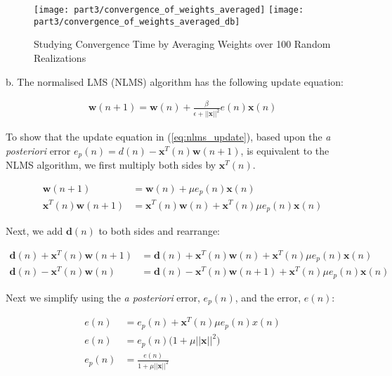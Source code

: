 \begin{figure}[H]
\centering{}
\texttt{[image: part3/convergence\_of\_weights\_averaged]}
\texttt{[image: part3/convergence\_of\_weights\_averaged\_db]}
\caption{Studying Convergence Time by Averaging Weights over 100 Random Realizations}
\end{figure}

\noindent{}b. The normalised LMS (NLMS) algorithm has the following update equation:

\begin{align}
\textbf{w}(n+1) = \textbf{w}(n) + \frac{\beta}{\epsilon + ||\textbf{x}||^2} e(n)\textbf{x}(n)\label{eq:nlms_algo}
\end{align}

\noindent{}To show that the update equation in (\ref{eq:nlms_update}), based upon the \textit{a posteriori} error $e_p(n)=d(n)-\textbf{x}^T(n)\textbf{w}(n+1)$, is equivalent to the NLMS algorithm, we first multiply both sides by $\textbf{x}^T(n)$. 

\begin{align}
\textbf{w}(n+1) &= \textbf{w}(n) + \mu e_p(n)\textbf{x}(n) \label{eq:nlms_update}\\
\textbf{x}^T(n)\textbf{w}(n+1) &= \textbf{x}^T(n)\textbf{w}(n) + \textbf{x}^T(n) \mu e_p(n) \textbf{x}(n) \nonumber
\end{align}

\noindent{}Next, we add $\textbf{d}(n)$ to both sides and rearrange:

\begin{align}
\textbf{d}(n)+\textbf{x}^T(n)\textbf{w}(n+1) &= \textbf{d}(n)+\textbf{x}^T(n)\textbf{w}(n) + \textbf{x}^T(n) \mu e_p(n) \textbf{x}(n) \nonumber\\
\textbf{d}(n)-\textbf{x}^T(n)\textbf{w}(n) &= \textbf{d}(n)-\textbf{x}^T(n)\textbf{w}(n+1) + \textbf{x}^T(n) \mu e_p(n) \textbf{x}(n)\label{eq:nlms_mid_proof}
\end{align}

\noindent{}Next we simplify using the \textit{a posteriori} error, $e_p(n)$, and the error, $e(n)$:

\begin{align}
e(n) &= e_p(n) + \textbf{x}^T(n) \mu e_p(n) x(n) \nonumber\\
e(n) &= e_p(n) \bigg(1+\mu ||\textbf{x}||^2\bigg) \nonumber\\
e_p(n) &= \frac{e(n)}{1+\mu||\textbf{x}||^2} \label{eq:a_posteriori_error}
\end{align}

